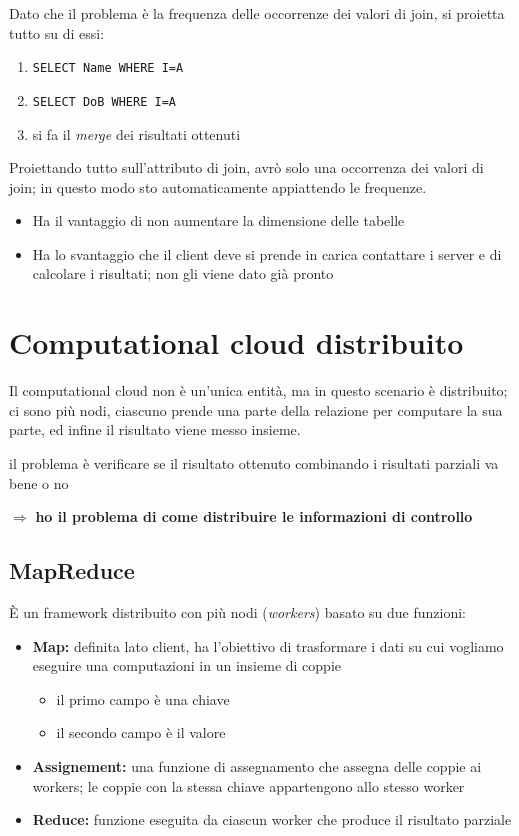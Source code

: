 \documentclass{report}
\begin{document}
Dato che il problema è la frequenza delle occorrenze dei valori di join, si proietta tutto su 
di essi: 
\begin{enumerate}
    \item \texttt{SELECT Name WHERE I=A}
    \item \texttt{SELECT DoB WHERE I=A}
    \item si fa il \textit{merge} dei risultati ottenuti 
\end{enumerate}

\noindent Proiettando tutto sull'attributo di join, avrò solo una occorrenza 
dei valori di join; in questo modo sto automaticamente appiattendo le frequenze.
\begin{itemize}
    \item Ha il vantaggio di non aumentare la dimensione delle tabelle 
    \item Ha lo svantaggio che il client deve si prende in carica contattare i server e 
    di calcolare i risultati; non gli viene dato già pronto
\end{itemize}



\section{Computational cloud distribuito}
Il computational cloud non è un'unica entità, ma in questo scenario è distribuito; ci sono più nodi, 
ciascuno prende una parte della relazione per computare la sua parte, ed infine il risultato 
viene messo insieme.

\noindent  il problema è verificare se il risultato ottenuto combinando i risultati parziali 
va bene o no

$\Rightarrow$ \textbf{ho il problema di come distribuire le informazioni di controllo}

\subsection{MapReduce}

È un framework distribuito con più nodi (\textit{workers}) basato su due funzioni:
\begin{itemize}
    \item \textbf{Map:} definita lato client, ha l'obiettivo di trasformare i dati su cui vogliamo eseguire una computazioni in un insieme di coppie 
    \begin{itemize}
        \item il primo campo è una chiave 
        \item il secondo campo è il valore
    \end{itemize}
    \item \textbf{Assignement:} una funzione di assegnamento che assegna delle coppie ai workers; le coppie con la stessa 
    chiave appartengono allo stesso worker
    \item \textbf{Reduce:} funzione eseguita da ciascun worker che produce il risultato parziale
\end{itemize}
\end{document}

